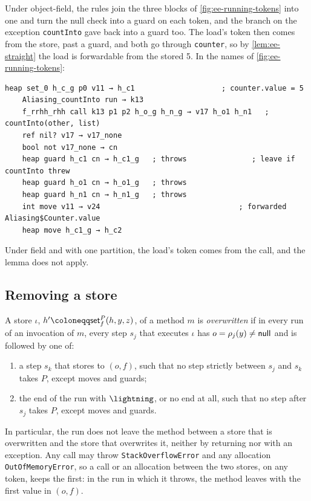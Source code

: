 \begin{example}\label{ex:ee-running-forwarded}
Under object-field, the rules join the three blocks of
\cref{fig:ee-running-tokens} into one and turn the null check into a guard on
each token, and the branch on the exception \texttt{countInto} gave back into
a guard too. The load's token then comes from the store, past a guard, and both
go through \texttt{counter}, so by \cref{lem:ee-straight} the load is
forwardable from the stored 5. In the names of \cref{fig:ee-running-tokens}:
\begin{lstlisting}[language=ct]
    heap set_0 h_c_g p0 v11 → h_c1                    ; counter.value = 5
    Aliasing_countInto run → k13
    f_rrhh_rhh call k13 p1 p2 h_o_g h_n_g → v17 h_o1 h_n1   ; countInto(other, list)
    ref nil? v17 → v17_none
    bool not v17_none → cn
    heap guard h_c1 cn → h_c1_g   ; throws               ; leave if countInto threw
    heap guard h_o1 cn → h_o1_g   ; throws
    heap guard h_n1 cn → h_n1_g   ; throws
    int move v11 → v24                                ; forwarded Aliasing$Counter.value
    heap move h_c1_g → h_c2
\end{lstlisting}
Under field and with one partition, the load's token comes from the call, and
the lemma does not apply.
\end{example}

\subsection{Removing a store}

\begin{definition}\label{def:ee-overwritten}
A store $\iota$, $h' \coloneqq \setf{f}{P}(h, y, z)$, of a method $m$ is
\emph{overwritten} if in every run of an invocation of $m$, every step $s_j$
that executes $\iota$ has $o = \rho_j(y) \neq \mathsf{null}$ and is followed by one of:
\begin{enumerate}
\item a step $s_k$ that stores to $(o, f)$, such that no step strictly between
  $s_j$ and $s_k$ takes $P$, except moves and guards;
\item the end of the run with $\Trap$, or no end at all, such that no step after
  $s_j$ takes $P$, except moves and guards.
\end{enumerate}
\end{definition}

In particular, the run does not leave the method between a store that is
overwritten and the store that overwrites it, neither by returning nor with an
exception. Any call may throw \texttt{StackOverflowError} and any allocation
\texttt{OutOfMemoryError}, so a call or an allocation between the two stores,
on any token, keeps the first: in the run in which it throws, the method leaves
with the first value in $(o, f)$.

